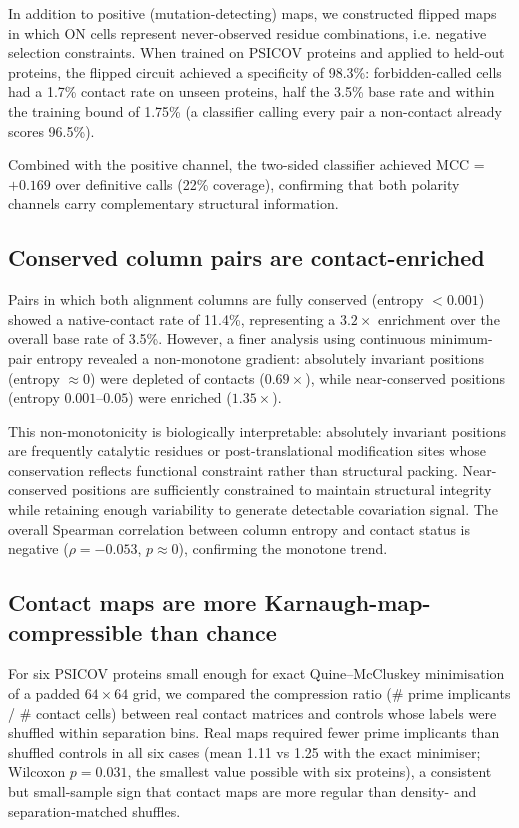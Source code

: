 In addition to positive (mutation-detecting) maps, we constructed flipped maps
in which ON cells represent never-observed residue combinations, i.e. negative
selection constraints.  When trained on PSICOV proteins and applied to
held-out proteins, the flipped circuit achieved a specificity of
98.3\%: forbidden-called cells had a 1.7\% contact rate on unseen proteins, half the 3.5\% base rate and within the training bound of 1.75\% (a classifier calling every pair a non-contact already scores 96.5\%).

Combined with the positive channel, the two-sided classifier achieved MCC =
$+0.169$ over definitive calls (22\% coverage), confirming that both polarity
channels carry complementary structural information.

\subsection{Conserved column pairs are contact-enriched}
\label{sec:res-conservation}

Pairs in which both alignment columns are fully conserved (entropy $< 0.001$)
showed a native-contact rate of 11.4\%, representing a $3.2\times$ enrichment
over the overall base rate of 3.5\%.  However, a finer analysis using
continuous minimum-pair entropy revealed a non-monotone gradient: absolutely
invariant positions (entropy $\approx 0$) were depleted of contacts
($0.69\times$), while near-conserved positions (entropy $0.001$--$0.05$) were
enriched ($1.35\times$).

This non-monotonicity is biologically interpretable: absolutely invariant
positions are frequently catalytic residues or post-translational modification
sites whose conservation reflects functional constraint rather than structural
packing.  Near-conserved positions are sufficiently constrained to maintain
structural integrity while retaining enough variability to generate detectable
covariation signal.  The overall Spearman correlation between column entropy
and contact status is negative ($\rho = -0.053$, $p \approx 0$), confirming
the monotone trend.

\subsection{Contact maps are more Karnaugh-map-compressible than chance}
\label{sec:res-compressibility}

For six PSICOV proteins small enough for exact Quine--McCluskey minimisation
of a padded $64 \times 64$ grid, we compared the compression ratio (\# prime
implicants / \# contact cells) between real contact matrices and controls whose
labels were shuffled within separation bins.  Real maps required fewer prime
implicants than shuffled controls in all six cases (mean 1.11 vs 1.25 with
the exact minimiser; Wilcoxon $p = 0.031$, the smallest value possible with
six proteins), a consistent but small-sample sign that contact maps are more
regular than density- and separation-matched shuffles.

